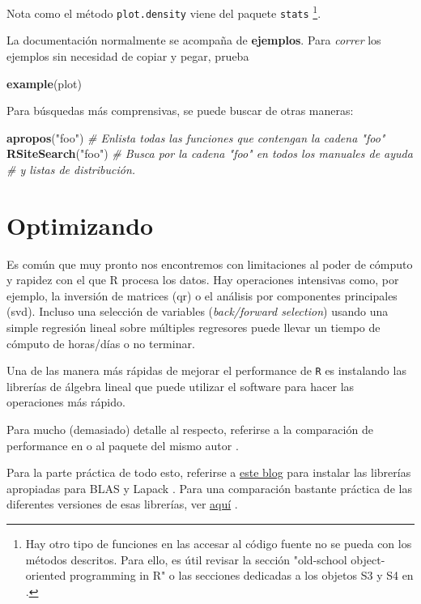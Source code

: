 \documentclass[]{article}
\newenvironment{Shaded}{\begin{snugshade}}{\end{snugshade}}
\newcommand{\KeywordTok}[1]{\textcolor[rgb]{0.13,0.29,0.53}{\textbf{#1}}}
\newcommand{\StringTok}[1]{\textcolor[rgb]{0.31,0.60,0.02}{#1}}
\newcommand{\CommentTok}[1]{\textcolor[rgb]{0.56,0.35,0.01}{\textit{#1}}}
\newcommand{\NormalTok}[1]{#1}
\let\rmarkdownfootnote\footnote%
\def\footnote{\protect\rmarkdownfootnote}
\begin{document}
Nota como el método \texttt{plot.density} viene del paquete
\texttt{stats}
\footnote{Hay otro tipo de funciones en las accesar al código fuente no se pueda con los métodos descritos. Para ello, es útil revisar la sección "old-school object-oriented programming in R" \parencite[][p.131-133]{adler2010r} o las secciones dedicadas a los objetos S3 y S4 en \textcite{wickham2014advanced}.}.

La documentación normalmente se acompaña de \textbf{ejemplos}. Para
\emph{correr} los ejemplos sin necesidad de copiar y pegar, prueba

\begin{Shaded}
\begin{Highlighting}[]
\KeywordTok{example}\NormalTok{(plot)}
\end{Highlighting}
\end{Shaded}

Para búsquedas más comprensivas, se puede buscar de otras maneras:

\begin{Shaded}
\begin{Highlighting}[]
\KeywordTok{apropos}\NormalTok{(}\StringTok{"foo"}\NormalTok{) }\CommentTok{# Enlista todas las funciones que contengan la cadena "foo"}
\KeywordTok{RSiteSearch}\NormalTok{(}\StringTok{"foo"}\NormalTok{) }\CommentTok{# Busca por la cadena "foo" en todos los manuales de ayuda }
\CommentTok{# y listas de distribución.}
\end{Highlighting}
\end{Shaded}

\section{Optimizando}\label{optimizando}

Es común que muy pronto nos encontremos con limitaciones al poder de
cómputo y rapidez con el que R procesa los datos. Hay operaciones
intensivas como, por ejemplo, la inversión de matrices (qr) o el
análisis por componentes principales (svd). Incluso una selección de
variables (\emph{back/forward selection}) usando una simple regresión
lineal sobre múltiples regresores puede llevar un tiempo de cómputo de
horas/días o no terminar.

Una de las manera más rápidas de mejorar el performance de \texttt{R} es
instalando las librerías de álgebra lineal que puede utilizar el
software para hacer las operaciones más rápido.

Para mucho (demasiado) detalle al respecto, referirse a la comparación
de performance en \textcite{eddelbuettel2010} o al paquete del mismo
autor \textcite{gcbd}.

Para la parte práctica de todo esto, referirse a
\href{http://brettklamer.com/diversions/statistical/faster-blas-in-r/}{este
blog} para instalar las librerías apropiadas para BLAS y Lapack
\parencite{blasinr}. Para una comparación bastante práctica de las
diferentes versiones de esas librerías, ver
\href{http://blog.nguyenvq.com/blog/2014/11/10/optimized-r-and-python-standard-blas-vs-atlas-vs-openblas-vs-mkl/}{aquí}
\parencite{optimizedr}.
\end{document}
